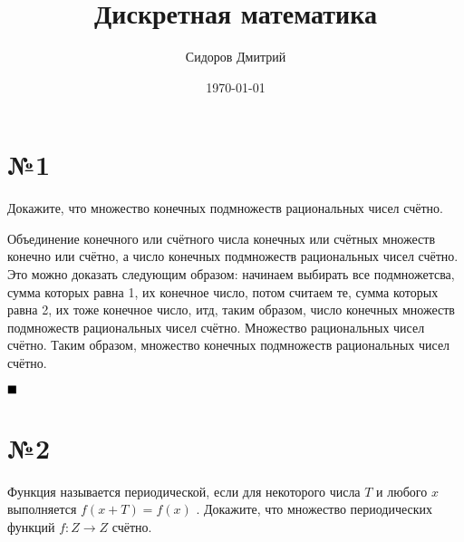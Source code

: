 \documentclass[a4paper, 16pt]{article}
\title{Дискретная математика}
\date{\today}
\author{Сидоров Дмитрий}
\affil{Группа БПМИ 219}
\newenvironment{proof}[1][Доказательство]{%
	\begin{trivlist}
		\item[\hskip \labelsep {\bfseries #1:}]
		\item \hspace{14pt}
	}{
		$ \hfill\blacksquare $
	\end{trivlist}
	\hfill\break
}
\begin{document}
	\maketitle
	
	\section*{№1}
	
		Докажите, что множество конечных подмножеств рациональных чисел счётно.
		
		\begin{proof}
			Объединение конечного или счётного числа конечных или счётных множеств конечно или счётно, а число конечных подмножеств рациональных чисел счётно. Это можно доказать следующим образом: начинаем выбирать все подмножетсва, сумма которых равна 1, их конечное число, потом считаем те, сумма которых равна 2, их тоже конечное число, итд, таким образом, число конечных множеств подмножеств рациональных чисел счётно. Множество рациональных чисел счётно. Таким образом, множество конечных подмножеств рациональных чисел счётно.
		\end{proof}
	
	\section*{№2}
	
		Функция называется периодической, если для некоторого числа
		$T$
		и любого
		$x$
		выполняется
		$f
		(
		x
		+
		T
		) =
		f
		(
		x
		)$
		. Докажите, что множество периодических функций
		$f
		:
		Z
		\rightarrow
		Z$
		счётно.
		
\end{document}

